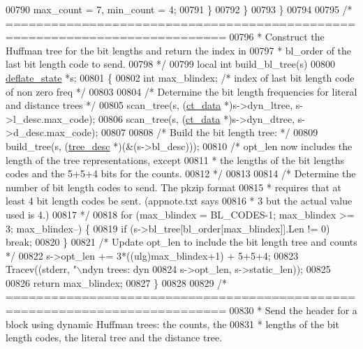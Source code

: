 \begin{DoxyCode}
{{{{{{{{{{{{{00790             max\_count = 7, min\_count = 4;
00791         \}
00792     \}
00793 \}
00794 
00795 \textcolor{comment}{/* ===========================================================================}
00796 \textcolor{comment}{ * Construct the Huffman tree for the bit lengths and return the index in}
00797 \textcolor{comment}{ * bl\_order of the last bit length code to send.}
00798 \textcolor{comment}{ */}
00799 local \textcolor{keywordtype}{int} build\_bl\_tree(s)
00800     \hyperlink{structinternal__state}{deflate\_state} *s;
00801 \{
00802     \textcolor{keywordtype}{int} max\_blindex;  \textcolor{comment}{/* index of last bit length code of non zero freq */}
00803 
00804     \textcolor{comment}{/* Determine the bit length frequencies for literal and distance trees */}
00805     scan\_tree(s, (\hyperlink{structct__data__s}{ct\_data} *)s->dyn\_ltree, s->l\_desc.max\_code);
00806     scan\_tree(s, (\hyperlink{structct__data__s}{ct\_data} *)s->dyn\_dtree, s->d\_desc.max\_code);
00807 
00808     \textcolor{comment}{/* Build the bit length tree: */}
00809     build\_tree(s, (\hyperlink{structtree__desc__s}{tree\_desc} *)(&(s->bl\_desc)));
00810     \textcolor{comment}{/* opt\_len now includes the length of the tree representations, except}
00811 \textcolor{comment}{     * the lengths of the bit lengths codes and the 5+5+4 bits for the counts.}
00812 \textcolor{comment}{     */}
00813 
00814     \textcolor{comment}{/* Determine the number of bit length codes to send. The pkzip format}
00815 \textcolor{comment}{     * requires that at least 4 bit length codes be sent. (appnote.txt says}
00816 \textcolor{comment}{     * 3 but the actual value used is 4.)}
00817 \textcolor{comment}{     */}
00818     \textcolor{keywordflow}{for} (max\_blindex = BL\_CODES-1; max\_blindex >= 3; max\_blindex--) \{
00819         \textcolor{keywordflow}{if} (s->bl\_tree[bl\_order[max\_blindex]].Len != 0) \textcolor{keywordflow}{break};
00820     \}
00821     \textcolor{comment}{/* Update opt\_len to include the bit length tree and counts */}
00822     s->opt\_len += 3*((ulg)max\_blindex+1) + 5+5+4;
00823     Tracev((stderr, \textcolor{stringliteral}{"\(\backslash\)ndyn trees: dyn %
00824             s->opt\_len, s->static\_len));
00825 
00826     \textcolor{keywordflow}{return} max\_blindex;
00827 \}
00828 
00829 \textcolor{comment}{/* ===========================================================================}
00830 \textcolor{comment}{ * Send the header for a block using dynamic Huffman trees: the counts, the}
00831 \textcolor{comment}{ * lengths of the bit length codes, the literal tree and the distance tree.}
}}}}}}}}}}}}}}
\end{DoxyCode}
